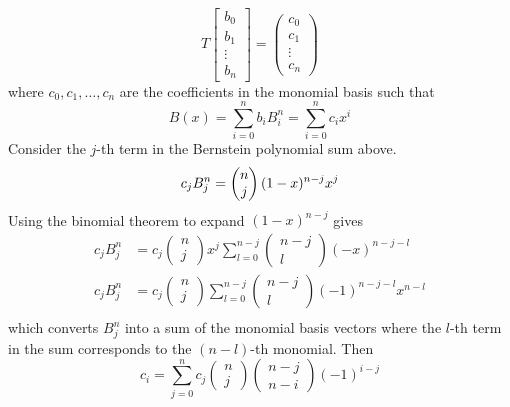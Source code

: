 \documentclass{article} %
\begin{document}
\begin{equation*}
T \begin{bmatrix} b_0 \\ b_1 \\ \vdots \\ b_n \end{bmatrix} = \begin{pmatrix} c_0 \\ c_1 \\ \vdots \\ c_n \end{pmatrix}
\end{equation*}
where $c_0, c_1, \hdots, c_n$ are the coefficients in the monomial basis such that
\begin{equation*}
B(x) = \sum_{i=0}^n b_i B_i^n = \sum_{i=0}^n c_i x^i
\end{equation*}
Consider the $j$-th term in the Bernstein polynomial sum above.
\begin{equation*}
c_j B_j^n = \begin{pmatrix} n \\ j \end{pmatrix} (1 - x)^{n-j} x^j \\
\end{equation*}
Using the binomial theorem to expand $(1-x)^{n-j}$ gives
\begin{align*}
c_j B_j^n &= c_j \begin{pmatrix} n \\ j \end{pmatrix} x^j  \sum_{l=0}^{n-j} \begin{pmatrix} 
n-j \\ l \end{pmatrix} (-x)^{n-j-l} \\
c_j B_j^n &= c_j \begin{pmatrix} n \\ j \end{pmatrix} \sum_{l=0}^{n-j} \begin{pmatrix} 
n-j \\ l \end{pmatrix} (-1)^{n-j-l} x^{n-l} \\
\end{align*}
which converts $B_j^n$ into a sum of the monomial basis vectors where the $l$-th term in the sum corresponds to the $(n-l)$-th monomial.  Then 
\begin{equation*} 
c_i = \sum_{j=0}^n c_j \begin{pmatrix} n \\ j \end{pmatrix} \begin{pmatrix} 
n-j \\ n-i \end{pmatrix} (-1)^{i-j} 
\end{equation*}
\end{document}
